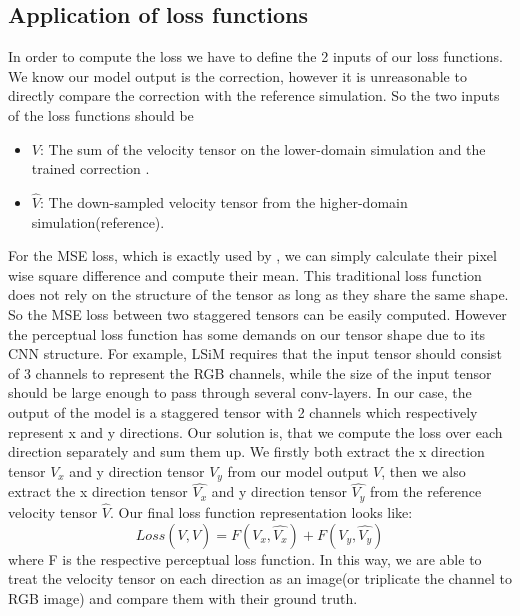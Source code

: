 \documentclass[a4paper,12pt,twoside]{report}
\begin{document}
\subsection{Application of loss functions}
In order to compute the loss we have to define the 2 inputs of our loss functions. We know our model output is the correction, however it is unreasonable to directly compare the correction with the reference simulation. So the two inputs of the loss functions should be 
\begin{itemize}
\item $V$: The sum of the velocity tensor on the lower-domain simulation and the trained correction .

\item $\hat{V}$: The down-sampled velocity tensor from the higher-domain simulation(reference).
\end{itemize}


For the MSE loss, which is exactly used by \citeauthor{um2020sol}, we can simply calculate their pixel wise square difference and compute their mean. This traditional loss function does not rely on the structure of the tensor as long as they share the same shape. So the MSE loss between two staggered tensors can be easily computed. However the perceptual loss function has some demands on our tensor shape due to its CNN structure. For example, LSiM requires that the input tensor should consist of 3 channels to represent the RGB channels, while the size of the input tensor should be large enough to pass through several conv-layers. In our case, the output of the model is a staggered tensor with 2 channels which respectively represent x and y directions. Our solution is, that we compute the loss over each direction separately and sum them up. We firstly both extract the x direction tensor $V_x$ and y direction tensor $V_y$ from our model output $V$, then we also extract the x direction tensor $\hat{V_x}$ and y direction tensor $\hat{V_y}$ from the reference velocity tensor $\hat{V}$. Our final loss function representation looks like:
\begin{equation}
 Loss(V, \hat{V}) = F(V_x, \hat{V_x}) + F(V_y, \hat{V_y})
\end{equation}
where F is the respective perceptual loss function. In this way, we are able to treat the velocity tensor on each direction as an image(or triplicate the channel to RGB image) and compare them with their ground truth.  
\end{document}
